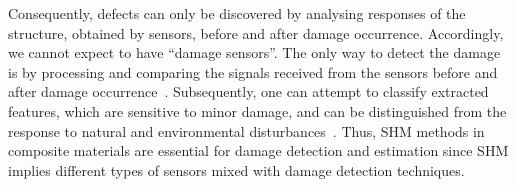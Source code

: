 Consequently, defects can only be discovered by analysing responses of the structure, obtained by sensors, before and after damage occurrence.
Accordingly, we cannot expect to have “damage sensors”.
The only way to detect the damage is by processing and comparing the signals received from the sensors before and after damage occurrence~\cite{s18041094}. 
Subsequen\-tly, one can attempt to classify extracted features, which are sensitive to minor damage, and can be distinguished from the response to natural and environmental disturbances~\cite{s18041094}. 
Thus, SHM  methods in composite materials are essential for damage detection and estimation since SHM implies different types of sensors mixed with damage detection techniques. 